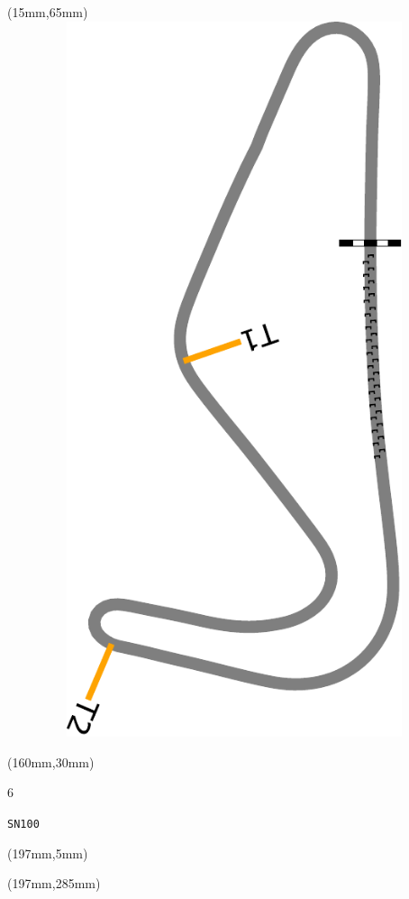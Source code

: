 \begin{textblock*}{185mm}(15mm,65mm)%
\centering
\mbox{\includegraphics[width=185mm,height=210mm,keepaspectratio]{PT/SN100.pdf}}
\end{textblock*}
\begin{textblock*}{40mm}(160mm,30mm)%
\Large
\par{} 
\par6 
\par\hfill\tiny\tt SN100\\
\end{textblock*}
\begin{textblock*}{20mm}(197mm,5mm)%
\fbox{\thepage}
\label{SN100}
\end{textblock*}
\begin{textblock*}{20mm}(197mm,285mm)%
\fbox{\thepage}
\end{textblock*}

